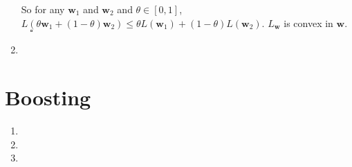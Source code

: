 \documentclass[paper=letter, fontsize=12pt]{article}
\begin{document}
\begin{enumerate}[label=(\alph*)]
	So for any $\mathbf{w}_1$ and $\mathbf{w}_2$ and $\theta \in [0, 1]$, $L(\theta \mathbf{w}_1 + (1- \theta) \mathbf{w}_2) \leq \theta L(\mathbf{w}_1) + (1 - \theta) L(\mathbf{w}_2)$. $L_{\mathbf{w}}$ is convex in $\mathbf{w}$. $\ \ \ \ \square$
	
	\item
	
\end{enumerate}

\section{Boosting}

\begin{enumerate}[label=(\alph*)]
	
	\item 
	
	\item 
	
	\item
\end{enumerate}
\end{document}
